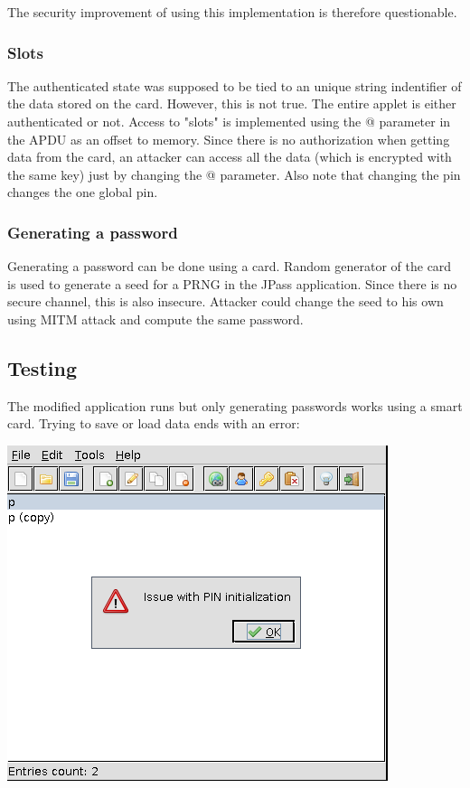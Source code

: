 \documentclass[paper=a4, fontsize=12pt]{scrartcl}
\begin{document}
The security improvement of using this implementation is therefore questionable.

\subsubsection{Slots}
The authenticated state was supposed to be tied to an unique string indentifier of the data stored on the card.
However, this is not true.
The entire applet is either authenticated or not.
Access to "slots" is implemented using the @ parameter in the APDU as an offset to memory.
Since there is no authorization when getting data from the card, an attacker can access all the data (which is encrypted with the same key) just by changing the @ parameter.
Also note that changing the pin changes the one global pin.

\subsubsection{Generating a password}
Generating a password can be done using a card.
Random generator of the card is used to generate a seed for a PRNG in the JPass application.
Since there is no secure channel, this is also insecure.
Attacker could change the seed to his own using MITM attack and compute the same password.


\subsection{Testing}
The modified application runs but only generating passwords works using a smart card.
Trying to save or load data ends with an error:

\includegraphics[scale=0.5]{jpass_error}
\end{document}
